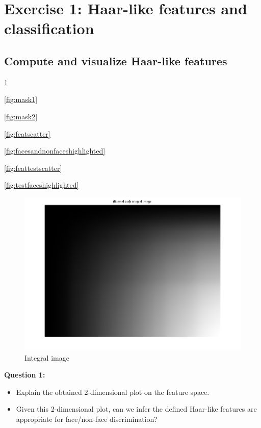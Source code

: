 \section{Exercise 1: Haar-like features and classification}

\subsection{Compute and visualize Haar-like features}

\ref{fig:integralim}

\ref{fig:mask1}

\ref{fig:mask2}

\ref{fig:featscatter}

\ref{fig:facesandnonfaceshighlighted}

\ref{fig:feattestscatter}

\ref{fig:testfaceshighlighted}

\begin{figure}[h!tb]
	\centering
		\includegraphics[width=\textwidth]{./img/ex1/integralim.png}
	\caption{Integral image}
	\label{fig:integralim}
\end{figure}

{\bfseries
Question 1:
\begin{itemize}
\item Explain the obtained 2-dimensional plot on the feature space.
\item Given this 2-dimensional plot, can we infer the defined Haar-like features are appropriate for face/non-face discrimination?
\end{itemize}}


